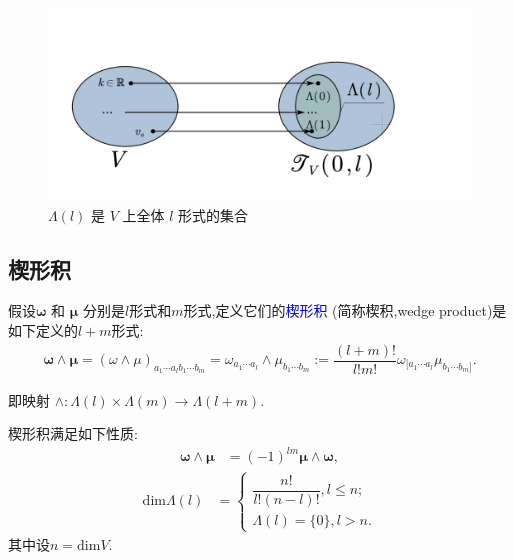 \begin{figure}[htbp]
    \centering
 \includegraphics[width=\textwidth]{img/5-1.png}
    \caption{$\Lambda(l)$ 是 $V$ 上全体 $l$ 形式的集合}
\end{figure}
\subsection{楔形积}
假设$\boldsymbol{\omega}$ 和 $\boldsymbol{\mu}$ 分别是$l$形式和$m$形式,定义它们的\textcolor{blue}{楔形积} (简称楔积,wedge product)是如下定义的$l+m$形式:
\begin{align}
\boldsymbol{\omega}\wedge\boldsymbol{\mu}=(\omega \wedge\mu)_{a_1\cdots a_lb_1\cdots b_m}
=\omega_{a_1\cdots a_l} \wedge\mu_{b_1\cdots b_m}
:=\dfrac{(l+m)!}{l!m!}\omega_{[a_1\cdots a_l}\mu_{b_1\cdots b_m]}.
\end{align}

即映射 $\wedge:\Lambda(l)\times\Lambda(m)\to\Lambda(l+m)$.

楔形积满足如下性质:
\begin{align}
    \boldsymbol{\omega}\wedge\boldsymbol{\mu}&=(-1)^{lm}\boldsymbol{\mu}\wedge \boldsymbol{\omega},
\end{align}
\begin{align}
    \mathrm{dim}\Lambda(l)&=\left\{
        \begin{aligned}
    \dfrac{n!}{l!(n-l)!},l\leqslant n;\\
    \Lambda(l)=\{0\},l>n.
        \end{aligned}
    \right.
\end{align}
其中设$n=\mathrm{dim}V$.

